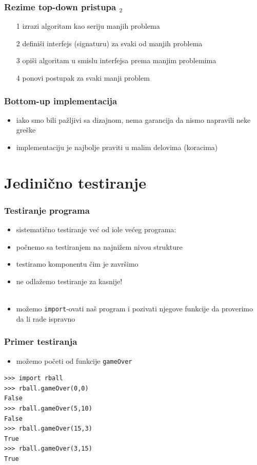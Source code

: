 \documentclass[utf8,compress,aspectratio=169]{beamer}
\begin{document}
\begin{frame}
  \frametitle{Rezime top-down pristupa $_2$}
\begin{itemize}
  \item[1] izrazi algoritam kao seriju manjih problema
  \item[2] definiši interfejs (signaturu) za svaki od manjih problema
  \item[3] opiši algoritam u smislu interfejsa prema manjim problemima
  \item[4] ponovi postupak za svaki manji problem
\end{itemize}
\end{frame}

\begin{frame}
  \frametitle{Bottom-up implementacija}
\begin{itemize}
  \item iako smo bili pažljivi sa dizajnom, nema garancija da nismo napravili neke greške
  \item implementaciju je najbolje praviti u malim delovima (koracima)
\end{itemize}
\end{frame}

\section[Testiranje]{Jedinično testiranje}

\begin{frame}
  \frametitle{Testiranje programa}
\begin{itemize}
  \item sistematično testiranje već od iole većeg programa:
  \item počnemo sa testiranjem na najnižem nivou strukture
  \item testiramo komponentu čim je završimo
  \item ne odlažemo testiranje za kasnije! \\ \ \\
  \item možemo \texttt{import}-ovati naš program i pozivati njegove funkcije da proverimo da li rade ispravno
\end{itemize}
\end{frame}

\begin{frame}[fragile]
  \frametitle{Primer testiranja}
\begin{itemize}
  \item možemo početi od funkcije \texttt{gameOver}
\end{itemize}
\begin{verbatim}
>>> import rball
>>> rball.gameOver(0,0)
False
>>> rball.gameOver(5,10)
False
>>> rball.gameOver(15,3)
True
>>> rball.gameOver(3,15)
True
\end{verbatim}
\end{frame}
\end{document}
